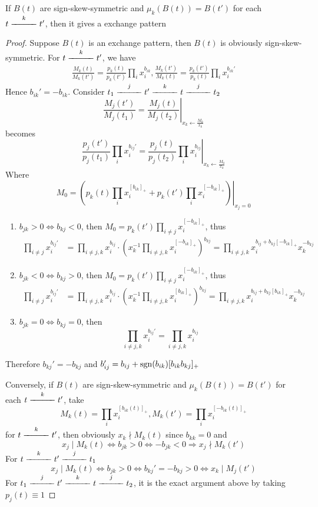 \documentclass[main]{subfiles}
\begin{document}
\begin{theorem}
If $B(t)$ are sign-skew-symmetric and $\mu_k(B(t))=B(t')$ for each $t\xedge kt'$, then it gives a exchange pattern
\end{theorem}

\begin{proof}
Suppose $B(t)$ is an exchange pattern, then $B(t)$ is obviously sign-skew-symmetric. For $t\xedge kt'$, we have
\begin{align*}
\frac{M_k(t)}{M_k(t')}=\frac{p_k(t)}{p_k(t')}\prod_ix_i^{b_{ik}}, \frac{M_k(t')}{M_k(t)}=\frac{p_k(t')}{p_k(t)}\prod_ix_i^{b_{ik}'}
\end{align*}
Hence $b_{ik}'=-b_{ik}$. Consider $t_1\xedge jt'\xedge kt\xedge jt_2$
\[\frac{M_j(t')}{M_j(t_1)}=\left.\frac{M_j(t)}{M_j(t_2)}\right|_{x_k\leftarrow \frac{M_0}{x_k}}\]
becomes
\[\frac{p_j(t')}{p_j(t_1)}\prod_ix_i^{b_{ij}'}=\left.\frac{p_j(t)}{p_j(t_2)}\prod_ix_i^{b_{ij}}\right|_{x_k\leftarrow \frac{M_0}{x_k}}\]
Where
\[M_0=\left.\left(p_k(t)\prod_ix_i^{[b_{ik}]_+}+p_k(t')\prod_ix_i^{[-b_{ik}]_+}\right)\right|_{x_j=0}\]
\begin{enumerate}[leftmargin=*,label=Case \arabic*:]
\item $b_{jk}>0\Leftrightarrow b_{kj}<0$, then $\displaystyle M_0=p_k(t')\prod_{i\neq j}x_i^{[-b_{ik}]_+}$, thus
\begin{align*}
\prod_{i\neq j}x_i^{b_{ij}'}&=\prod_{i\neq j,k}x_i^{b_{ij}}\cdot\left(x_k^{-1}\displaystyle\prod_{i\neq j,k}x_i^{[-b_{ik}]_+}\right)^{b_{kj}}=\prod_{i\neq j,k}x_i^{b_{ij}+b_{kj}[-b_{ik}]_+}x_k^{-b_{kj}}
\end{align*}
\item $b_{jk}<0\Leftrightarrow b_{kj}>0$, then $\displaystyle  M_0=p_k(t')\prod_{i\neq j}x_i^{[-b_{ik}]_+}$, thus
\begin{align*}
\prod_{i\neq j}x_i^{b_{ij}'}&=\prod_{i\neq j,k}x_i^{b_{ij}}\cdot\left(x_k^{-1}\displaystyle\prod_{i\neq j,k}x_i^{[b_{ik}]_+}\right)^{b_{kj}}=\prod_{i\neq j,k}x_i^{b_{ij}+b_{kj}[b_{ik}]_+}x_k^{-b_{kj}}
\end{align*}
\item $b_{jk}=0\Leftrightarrow b_{kj}=0$, then
\[\prod_{i\neq j,k}x_i^{b_{ij}'}=\prod_{i\neq j,k}x_i^{b_{ij}}\]
\end{enumerate}
Therefore $b_{kj}'=-b_{kj}$ and $b_{ij}'=b_{ij}+\operatorname{sgn}(b_{ik})[b_{ik}b_{kj}]_+$ \par
Conversely, if $B(t)$ are sign-skew-symmetric and $\mu_k(B(t))=B(t')$ for each $t\xedge kt'$, take
\[M_k(t)=\prod_ix_i^{[b_{ik}(t)]_+},M_k(t')=\prod_ix_i^{[-b_{ik}(t)]_+}\]
 for $t\xedge kt'$, then obviously $x_k\nmid M_k(t)$ since $b_{kk}=0$ and
 \[x_j\mid M_k(t)\Leftrightarrow b_{jk}>0\Leftrightarrow -b_{jk}<0\Rightarrow x_j\nmid M_k(t')\]
For $t\xedge kt'\xedge jt_1$
\[x_j\mid M_k(t)\Leftrightarrow b_{jk}>0\Leftrightarrow b_{kj}'=-b_{kj}>0\Leftrightarrow x_k\mid M_j(t')\]
For $t_1\xedge jt'\xedge kt\xedge j t_2$, it is the exact argument above by taking $p_j(t)\equiv1$
\end{proof}
\end{document}
